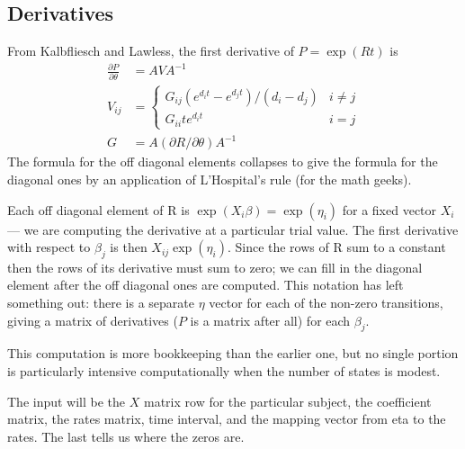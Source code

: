 \documentclass{article}
\begin{document}
\subsection{Derivatives}
From Kalbfliesch and Lawless, the first derivative of 
$P = \exp(Rt)$ is
\begin{align*}
  \frac{\partial P}{\partial \theta} &= AVA^{-1} \\
     V_{ij} &= \left\{ \begin{array}{ll}
         G_{ij}(e^{d_i t} - e^{d_j t})/(d_i - d_j) & i \ne j \\
         G_{ii}t e^{d_it} & i=j 
         \end{array} \right. \\
       G&= A (\partial R /\partial \theta) A^{-1}
\end{align*}
The formula for the off diagonal elements collapses to give the formula for
the diagonal ones by an application of L'Hospital's rule (for the math
geeks).

Each off diagonal element of R is $\exp(X_i\beta)= \exp(\eta_i)$ for a fixed
vector $X_i$ --- we are computing the derivative at a particular trial value.
The first derivative with respect to
$\beta_j$ is then $X_{ij} \exp(\eta_{i})$.
Since the rows of R sum to a constant then the rows of 
its derivative must sum to zero;
we can fill in the diagonal element after the off diagonal ones are computed.
This notation has left something out: there is a separate $\eta$ vector
for each of the non-zero transitions, giving a matrix
of derivatives ($P$ is a matrix after all) for each $\beta_j$.

This computation is more bookkeeping than the earlier one, but no
single portion is particularly intensive computationally when the number
of states is modest.

The input will be the $X$ matrix row for the particular subject, 
the coefficient matrix, the rates matrix, time interval, and the mapping
vector from eta to the rates.  The last tells us where the zeros are.
\end{document}
